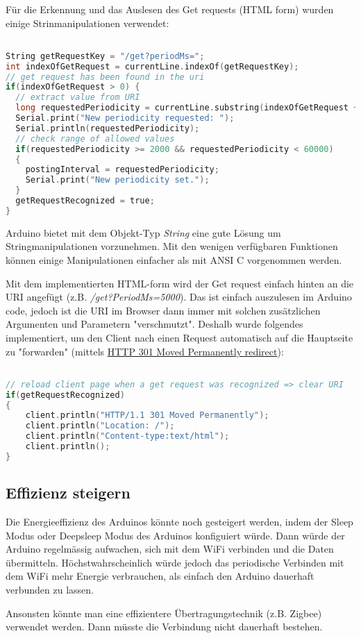 \documentclass{article}
\begin{document}
Für die Erkennung und das Auslesen des Get requests (HTML form) wurden einige Strinmanipulationen verwendet:
\begin{lstlisting}[style=CStyle, language=C, caption=String Manipulationen]  % Start your code-block

String getRequestKey = "/get?periodMs=";
int indexOfGetRequest = currentLine.indexOf(getRequestKey);
// get request has been found in the uri
if(indexOfGetRequest > 0) {   
  // extract value from URI
  long requestedPeriodicity = currentLine.substring(indexOfGetRequest + getRequestKey.length()).toInt();  
  Serial.print("New periodicity requested: ");
  Serial.println(requestedPeriodicity);
  // check range of allowed values
  if(requestedPeriodicity >= 2000 && requestedPeriodicity < 60000)  
  {
    postingInterval = requestedPeriodicity;
    Serial.print("New periodicity set.");
  }
  getRequestRecognized = true;
}

\end{lstlisting}
Arduino bietet mit dem Objekt-Typ \textit{String} eine gute Lösung um Stringmanipulationen vorzunehmen. Mit den wenigen verfügbaren Funktionen können einige Manipulationen einfacher als mit ANSI C vorgenommen werden.

Mit dem implementierten HTML-form wird der Get request einfach hinten an die URI angefügt (z.B. \textit{/get?PeriodMs=5000}). Das ist einfach auszulesen im Arduino code, jedoch ist die URI im Browser dann immer mit solchen zusätzlichen Argumenten und Parametern "verschmutzt". Deshalb wurde folgendes implementiert, um den Client nach einen Request automatisch auf die Hauptseite zu "forwarden" (mittels \href{https://en.wikipedia.org/wiki/URL_redirection}{HTTP 301 Moved Permanently redirect}):
\begin{lstlisting}[style=CStyle, language=C, caption=Automatischer Redirect]  % Start your code-block

// reload client page when a get request was recognized => clear URI
if(getRequestRecognized)
{
    client.println("HTTP/1.1 301 Moved Permanently");
    client.println("Location: /");
    client.println("Content-type:text/html");
    client.println();
}

\end{lstlisting}



\subsection{Effizienz steigern}

Die Energieeffizienz des Arduinos könnte noch gesteigert werden, indem der Sleep Modus oder Deepsleep Modus des Arduinos konfiguiert würde. Dann würde der Arduino regelmässig aufwachen, sich mit dem WiFi verbinden und die Daten übermitteln.
Höchstwahrscheinlich würde jedoch das periodische Verbinden mit dem WiFi mehr Energie verbrauchen, als einfach den Arduino dauerhaft verbunden zu lassen.

Ansonsten könnte man eine effizientere Übertragungstechnik (z.B. Zigbee) verwendet werden. Dann müsste die Verbindung nicht dauerhaft bestehen.
\end{document}
